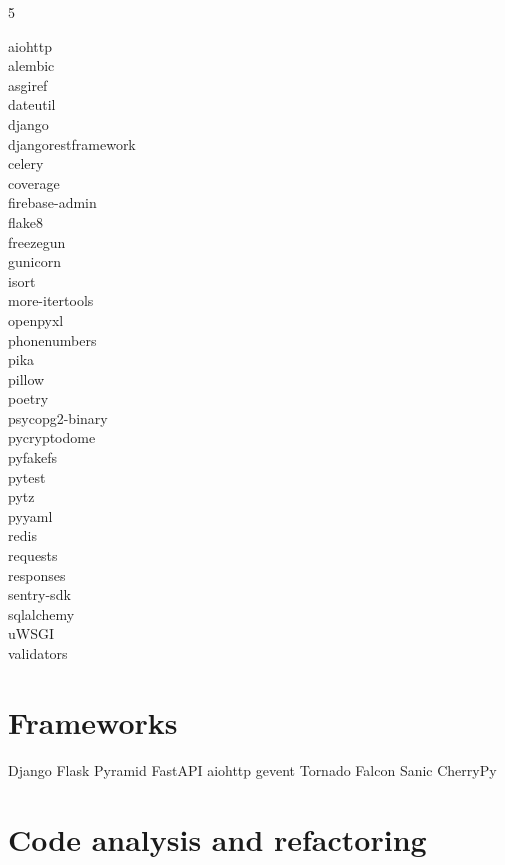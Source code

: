 \documentclass [8pt] {extarticle}
\begin{document}
    \begin {multicols} {5}

    aiohttp \\
    alembic \\
    asgiref \\
    dateutil \\
    django \\
    djangorestframework \\
    celery \\
    coverage \\
    firebase-admin \\
    flake8 \\
    freezegun \\
    gunicorn \\
    isort \\
    more-itertools \\
    openpyxl \\
    phonenumbers \\
    pika \\
    pillow \\
    poetry \\
    psycopg2-binary \\
    pycryptodome \\
    pyfakefs \\
    pytest \\
    pytz \\
    pyyaml \\
    redis \\
    requests \\
    responses \\
    sentry-sdk \\
    sqlalchemy \\
    uWSGI \\
    validators \\

    \end {multicols}

    \section {Frameworks}

    Django \quad
    Flask \quad
    Pyramid \quad
    FastAPI \quad
    aiohttp \quad
    gevent \quad
    Tornado \quad
    Falcon \quad
    Sanic \quad
    CherryPy \quad

    \section {Code analysis and refactoring}
\end{document}
